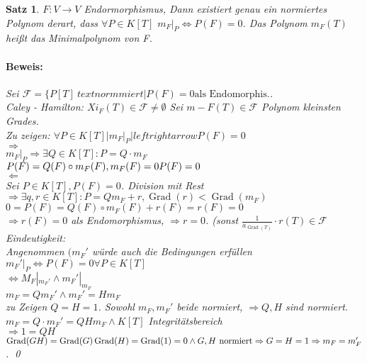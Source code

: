 \documentclass{report}
\DeclareMathOperator{\Grad}{Grad}
\theoremstyle{customrem}
\theoremstyle{customdef}
\newtheorem{satz}[definition]{Satz}
\renewenvironment{proof}{\paragraph{Beweis: }}{\qed}
\theoremstyle{customenv}
\begin{document}
\begin{satz}
  \(F : V \to V\) Endormorphismus, Dann existiert genau ein normiertes Polynom
  derart, dass \(\forall P \in K[T]\)  \(m_F|_P \Leftrightarrow P(F) = 0\).
  Das Polynom \(m_F(T)\) hei\ss{}t das Minimalpolynom von F.
  \begin{proof}
    Sei \(\mathcal{F} = \{P[T] \ text{normmiert} | P(F) = 0 \text{als Endomorphis.}\).\\
    Caley - Hamilton:
    \(Xi_F(T) \in \mathcal{F} \neq \emptyset\) Sei \(m-F(T) \in \mathcal{F}\)
    Polynom kleinsten Grades.\\
    Zu zeigen: \(\forall P \in K[T] | m_F|_P |leftrightarrow P(F) = 0\)\\
    \(\Rightarrow\)\\
    \(m_F |_P \Rightarrow \exists Q \in K[T] : P = Q \cdot m_F\)\\
    \(P(F) = Q(F) \circ m_F(F), m_F(F) = 0\\
     P(F) = 0\)\\
    \(\Leftarrow\)\\
    Sei \(P \in K[T], P(F) = 0\). Division mit Rest
    \(\Rightarrow \exists q, r \in K[T] : P = Q m_F + r, \Grad(r) < \Grad(m_F)\)
    \(0 = P(F) = Q(F) \circ m_F(F) + r(F) = r(F) = 0\)\\
    \(\Rightarrow r(F) = 0\) als Endomorphismus, \(\Rightarrow r = 0\).
    (sonst \(\frac{1}{a_{\Grad(T)}} \cdot r(T) \in \mathcal{F}\)\\
    Eindeutigkeit:\\
    Angenommen \((m_F'\) w\"urde auch die Bedingungen erf\"ullen\\
    \(m_F'|_P \Leftrightarrow P(F) = 0 \forall P \in K[T]\)\\
    \(\Leftrightarrow M_F|_{m_F'} \land m_F'|_{m_F}\)\\
    \(m_F = Q m_F' \land m_F' = H m_F\)\\
    zu Zeigen \(Q = H = 1\). Sowohl \(m_F, m_F'\) beide normiert, \(\Rightarrow
    Q, H\) sind normiert.\\
    \(m_F = Q \cdot m_F' = Q H m_F \land K[T] \) Integrit\"atsbereich\\
    \(\Rightarrow 1 = Q H\)\\
    \(\Grad(G H) = \Grad(G) \Grad(H) = \Grad(1) = 0 \land G, H \text{ normiert}\\
    \Rightarrow G = H = 1 \Rightarrow m_F = m_F'\).
  \end{proof}
\end{satz}
\end{document}
